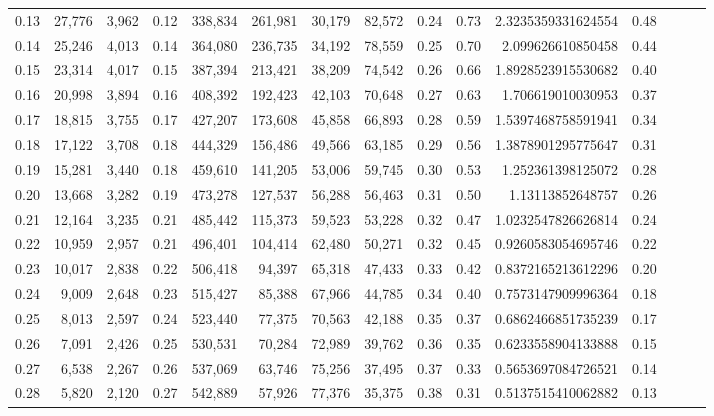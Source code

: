 \begin{tabular}{rrrrrrrrrrrrrrr}
0.13 &  27,776 &  3,962 &  0.12 &  338,834 &  261,981 &   30,179 &   82,572 &  0.24 &  0.73 &      2.3235359331624554 &      0.48 \\
0.14 &  25,246 &  4,013 &  0.14 &  364,080 &  236,735 &   34,192 &   78,559 &  0.25 &  0.70 &       2.099626610850458 &      0.44 \\
0.15 &  23,314 &  4,017 &  0.15 &  387,394 &  213,421 &   38,209 &   74,542 &  0.26 &  0.66 &      1.8928523915530682 &      0.40 \\
0.16 &  20,998 &  3,894 &  0.16 &  408,392 &  192,423 &   42,103 &   70,648 &  0.27 &  0.63 &       1.706619010030953 &      0.37 \\
0.17 &  18,815 &  3,755 &  0.17 &  427,207 &  173,608 &   45,858 &   66,893 &  0.28 &  0.59 &      1.5397468758591941 &      0.34 \\
0.18 &  17,122 &  3,708 &  0.18 &  444,329 &  156,486 &   49,566 &   63,185 &  0.29 &  0.56 &      1.3878901295775647 &      0.31 \\
0.19 &  15,281 &  3,440 &  0.18 &  459,610 &  141,205 &   53,006 &   59,745 &  0.30 &  0.53 &       1.252361398125072 &      0.28 \\
0.20 &  13,668 &  3,282 &  0.19 &  473,278 &  127,537 &   56,288 &   56,463 &  0.31 &  0.50 &        1.13113852648757 &      0.26 \\
0.21 &  12,164 &  3,235 &  0.21 &  485,442 &  115,373 &   59,523 &   53,228 &  0.32 &  0.47 &      1.0232547826626814 &      0.24 \\
0.22 &  10,959 &  2,957 &  0.21 &  496,401 &  104,414 &   62,480 &   50,271 &  0.32 &  0.45 &      0.9260583054695746 &      0.22 \\
0.23 &  10,017 &  2,838 &  0.22 &  506,418 &   94,397 &   65,318 &   47,433 &  0.33 &  0.42 &      0.8372165213612296 &      0.20 \\
0.24 &   9,009 &  2,648 &  0.23 &  515,427 &   85,388 &   67,966 &   44,785 &  0.34 &  0.40 &      0.7573147909996364 &      0.18 \\
0.25 &   8,013 &  2,597 &  0.24 &  523,440 &   77,375 &   70,563 &   42,188 &  0.35 &  0.37 &      0.6862466851735239 &      0.17 \\
0.26 &   7,091 &  2,426 &  0.25 &  530,531 &   70,284 &   72,989 &   39,762 &  0.36 &  0.35 &      0.6233558904133888 &      0.15 \\
0.27 &   6,538 &  2,267 &  0.26 &  537,069 &   63,746 &   75,256 &   37,495 &  0.37 &  0.33 &      0.5653697084726521 &      0.14 \\
0.28 &   5,820 &  2,120 &  0.27 &  542,889 &   57,926 &   77,376 &   35,375 &  0.38 &  0.31 &      0.5137515410062882 &      0.13 \\

\end{tabular}
